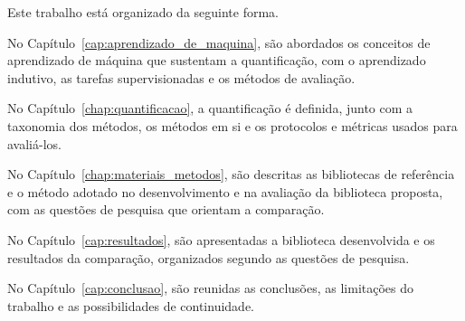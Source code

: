 Este trabalho está organizado da seguinte forma.

No Capítulo~\ref{cap:aprendizado_de_maquina}, são abordados os conceitos de aprendizado
de máquina que sustentam a quantificação, com o aprendizado indutivo, as tarefas
supervisionadas e os métodos de avaliação.

No Capítulo~\ref{chap:quantificacao}, a quantificação é definida, junto com a taxonomia
dos métodos, os métodos em si e os protocolos e métricas usados para avaliá-los.

No Capítulo~\ref{chap:materiais_metodos}, são descritas as bibliotecas de referência e o
método adotado no desenvolvimento e na avaliação da biblioteca proposta, com as questões
de pesquisa que orientam a comparação.

No Capítulo~\ref{cap:resultados}, são apresentadas a biblioteca desenvolvida e os
resultados da comparação, organizados segundo as questões de pesquisa.

No Capítulo~\ref{cap:conclusao}, são reunidas as conclusões, as limitações do trabalho e
as possibilidades de continuidade.
